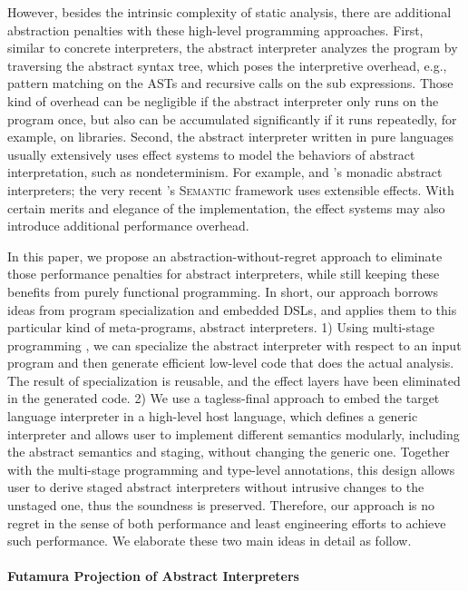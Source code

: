 However, besides the intrinsic complexity of static analysis, there are
additional abstraction penalties with these high-level programming approaches.
First, similar to concrete interpreters, the abstract interpreter analyzes the
program by traversing the abstract syntax tree, which poses the interpretive
overhead, e.g., pattern matching on the ASTs and recursive calls on the sub
expressions. Those kind of overhead can be negligible if the abstract
interpreter only runs on the program once, but also can be accumulated
significantly if it runs repeatedly, for example, on libraries. Second, the
abstract interpreter written in pure languages usually extensively uses effect
systems to model the behaviors of abstract interpretation, such as
nondeterminism. For example, \citet{DBLP:journals/pacmpl/DaraisLNH17} and
\citet{Sergey:2013:MAI:2491956.2491979}'s monadic abstract interpreters;
the very recent \citet{Githubsemantic}'s \textsc{Semantic} framework
uses extensible effects. With certain merits and elegance of the implementation,
the effect systems may also introduce additional performance overhead.

In this paper, we propose an abstraction-without-regret approach to
eliminate those performance penalties for abstract interpreters, while
still keeping these benefits from purely functional programming.  In
short, our approach borrows ideas from program specialization and
embedded DSLs, and applies them to this particular kind of
meta-programs, abstract interpreters.  1) Using multi-stage
programming , we can specialize the
abstract interpreter with respect to an input program and then
generate efficient low-level code that does the actual analysis. The
result of specialization is reusable, and the effect layers have been
eliminated in the generated code. 2) We use a tagless-final approach
to embed the target language interpreter in a high-level host language,
which defines a generic interpreter and allows user to
implement different semantics modularly, including the abstract
semantics and staging, without changing the generic one.
Together with the multi-stage programming and type-level
annotations, this design allows user to derive staged abstract
interpreters without intrusive changes to the unstaged one, thus the soundness is preserved. 
Therefore, our approach is no regret in the sense of both performance and least
engineering efforts to achieve such performance. We elaborate these
two main ideas in detail as follow.

\paragraph{Futamura Projection of Abstract Interpreters}

